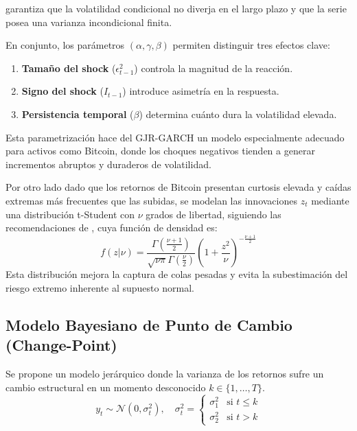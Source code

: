\documentclass[
]{ceurart}
\begin{document}
garantiza que la volatilidad condicional no diverja en el largo plazo y que la serie posea una varianza incondicional finita.

En conjunto, los parámetros $(\alpha, \gamma, \beta)$ permiten distinguir tres efectos clave:
\begin{enumerate}
    \item \textbf{Tamaño del shock} ($\epsilon_{t-1}^2$)
    controla la magnitud de la reacción.
    \item \textbf{Signo del shock} ($I_{t-1}$)
    introduce asimetría en la respuesta.
    \item \textbf{Persistencia temporal} ($\beta$)
    determina cuánto dura la volatilidad elevada.
\end{enumerate}

Esta parametrización hace del GJR-GARCH un modelo especialmente adecuado para activos como Bitcoin, donde los choques negativos tienden a generar incrementos abruptos y duraderos de volatilidad.


Por otro lado dado que los retornos de Bitcoin presentan curtosis elevada y caídas extremas más frecuentes que las subidas, se modelan las innovaciones $z_t$ mediante una distribución t-Student con $\nu$ grados de libertad, siguiendo las recomendaciones de \cite{tsay2010}, cuya función de densidad es:
\begin{equation}
f(z|\nu) = \frac{\Gamma(\frac{\nu+1}{2})}{\sqrt{\nu\pi}\Gamma(\frac{\nu}{2})} \left(1 + \frac{z^2}{\nu}\right)^{-\frac{\nu+1}{2}}
\end{equation}
Esta distribución mejora la captura de colas pesadas y evita la subestimación del riesgo extremo inherente al supuesto normal.


\subsection{Modelo Bayesiano de Punto de Cambio (Change-Point)}
Se propone un modelo jerárquico donde la varianza de los retornos sufre un cambio estructural en un momento desconocido $k \in \{1, \dots, T\}$.
\begin{equation}
y_{t} \sim \mathcal{N}(0, \sigma_{t}^{2}), \quad \sigma_{t}^{2} = \begin{cases} \sigma_1^2 & \text{si } t \le k \\ \sigma_2^2 & \text{si } t > k \end{cases}
\end{equation}
\end{document}
